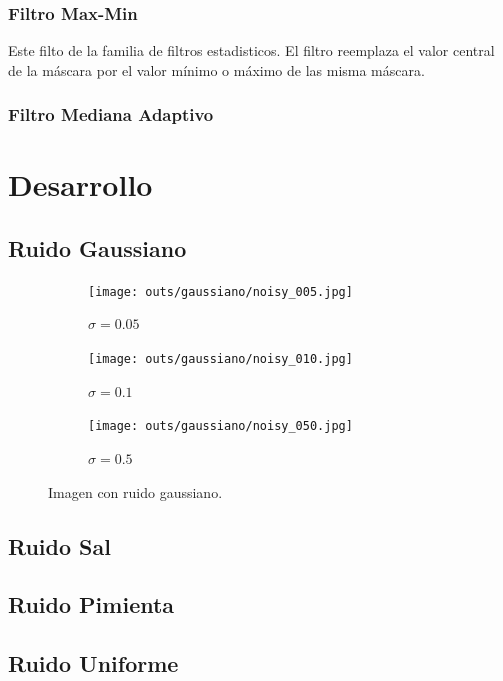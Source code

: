 \documentclass[
  letterpaper,
  twocolumn,
  9pt,
  journal,
  final]{IEEEtran}
\begin{document}
\subsubsection{Filtro Max-Min}
Este filto de la familia de filtros estadisticos. El filtro reemplaza el valor central de la máscara por el valor mínimo o máximo de las misma máscara.

\subsubsection{Filtro Mediana Adaptivo}


\section{Desarrollo}

\subsection{Ruido Gaussiano}

\begin{figure}[!tbh]
  \centering
  \begin{subfigure}[b]{.32\linewidth}
    \texttt{[image: outs/gaussiano/noisy\_005.jpg]}
    \caption{$\sigma=0.05$}\label{gauss_0.05}
  \end{subfigure}
  \begin{subfigure}[b]{.32\linewidth}
    \texttt{[image: outs/gaussiano/noisy\_010.jpg]}
    \caption{$\sigma=0.1$}\label{gauss_0.10}
  \end{subfigure}
  \begin{subfigure}[b]{.32\linewidth}
    \texttt{[image: outs/gaussiano/noisy\_050.jpg]}
    \caption{$\sigma=0.5$}\label{lata_gauss_0.50}
  \end{subfigure}
  \caption{Imagen con ruido gaussiano.}
  \label{gauss}
\end{figure}

\subsection{Ruido Sal}

\subsection{Ruido Pimienta}

\subsection{Ruido Uniforme}




\nocite{*}


\end{document}
